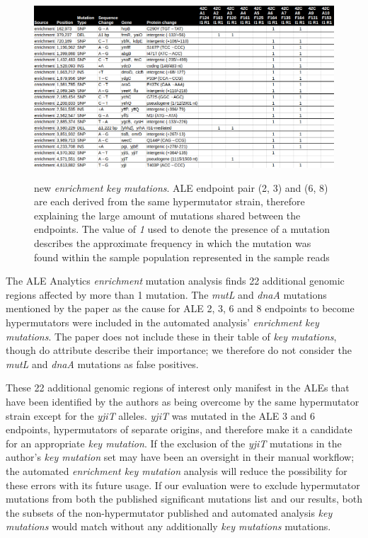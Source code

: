 \documentclass[12pt,final,masters,chapterheads]{ucsd}  %
\begin{document}
\begin{figure}[H]
  \caption{new \textit{enrichment key mutations}. ALE endpoint pair (2, 3) and (6, 8) are each derived from the same hypermutator strain, therefore explaining the large amount of mutations shared between the endpoints. The value of \textit{1} used to denote the presence of a mutation describes the approximate frequency in which the mutation was found within the sample population represented in the sample reads \cite{breseq_paper}}
  \centering
  \includegraphics[width=\textwidth]{42c_new_enrich_muts.png}
  \label{fig:42c_new_enrich_muts}
\end{figure}

The ALE Analytics \textit{enrichment} mutation analysis finds 22 additional genomic regions affected by more than 1 mutation. The \textit{mutL} and \textit{dnaA} mutations mentioned by the paper as the cause for ALE 2, 3, 6 and 8 endpoints to become hypermutators were included in the automated analysis' \textit{enrichment key mutations}. The paper does not include these in their table of \textit{key mutations}, though do attribute describe their importance; we therefore do not consider the \textit{mutL} and \textit{dnaA} mutations as false positives.

These 22 additional genomic regions of interest only manifest in the ALEs that have been identified by the authors as being overcome by the same hypermutator strain except for the \textit{yjiT} alleles. \textit{yjiT} was mutated in the ALE 3 and 6 endpoints, hypermutators of separate origins, and therefore make it a candidate for an appropriate \textit{key mutation}. If the exclusion of the \textit{yjiT} mutations in the author's \textit{key mutation} set may have been an oversight in their manual workflow; the automated \textit{enrichment key mutation} analysis will reduce the possibility for these errors with its future usage. If our evaluation were to exclude hypermutator mutations from both the published significant mutations list and our results, both the subsets of the non-hypermutator published and automated analysis \textit{key mutations} would match without any additionally \textit{key mutations} mutations. 
\end{document}
